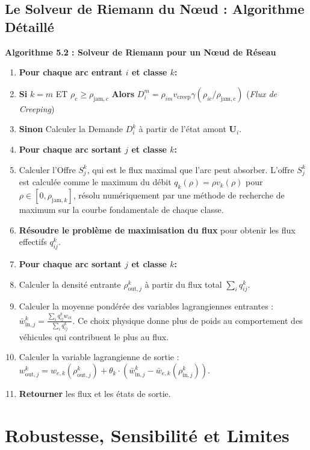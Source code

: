 \subsection{Le Solveur de Riemann du Nœud : Algorithme Détaillé}
\textbf{Algorithme 5.2 : Solveur de Riemann pour un Nœud de Réseau}

\begin{enumerate}
    \item \textbf{Pour chaque arc entrant $i$ et classe $k$:}
    \item \quad \textbf{Si} $k=m$ ET $\rho_c \ge \rho_{\text{jam},c}$ \textbf{Alors} $D_i^m = \rho_{im} v_{\text{creep}} \gamma(\rho_{ic}/\rho_{\text{jam},c})$  (\textit{Flux de Creeping})
    \item \quad \textbf{Sinon} Calculer la Demande $D_i^k$ à partir de l'état amont $\mathbf{U}_i$.
    \item \textbf{Pour chaque arc sortant $j$ et classe $k$:}
    \item \quad Calculer l'Offre $S_j^k$, qui est le flux maximal que l'arc peut absorber. L'offre $S_j^k$ est calculée comme le maximum du débit $q_k(\rho) = \rho v_k(\rho)$ pour $\rho \in [0, \rho_{\text{jam},k}]$, résolu numériquement par une méthode de recherche de maximum sur la courbe fondamentale de chaque classe.
    \item \textbf{Résoudre le problème de maximisation du flux} pour obtenir les flux effectifs $q_{ij}^k$.
    \item \textbf{Pour chaque arc sortant $j$ et classe $k$:}
    \item \quad Calculer la densité entrante $\rho_{\text{out},j}^k$ à partir du flux total $\sum_i q_{ij}^k$.
    \item \quad Calculer la moyenne pondérée des variables lagrangiennes entrantes : $\bar{w}_{\text{in},j}^k = \frac{\sum_i q_{ij}^k w_{ik}}{\sum_i q_{ij}^k}$. Ce choix physique donne plus de poids au comportement des véhicules qui contribuent le plus au flux.
    \item \quad Calculer la variable lagrangienne de sortie : $w_{\text{out},j}^k = w_{e,k}(\rho_{\text{out},j}^k) + \theta_k \cdot (\bar{w}_{\text{in},j}^k - \bar{w}_{e,k}(\rho_{\text{in},j}^k))$.
    \item \textbf{Retourner} les flux et les états de sortie.
\end{enumerate}

\section{Robustesse, Sensibilité et Limites}

